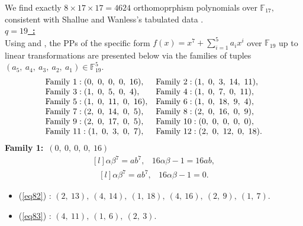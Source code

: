 \documentclass[12pt,a4wide, reqno]{amsart}
\theoremstyle{definition}
\theoremstyle{remark}
\numberwithin{equation}{section}
\begin{document}
We find exactly $8\times 17 \times 17=4624$ orthomoprphism polynomials over $\mathbb{F}_{17},$ consistent with Shallue and Wanless's tabulated data \cite[Table~3.2]{shallue}.
 \vspace{0.5 cm}\\
\underline{\Large \textbf{$q=19$~:}}
\vspace{0.2cm}\\
Using  and , the PPs of the specific form $f(x)=x^7+\sum_{i=1}^{5}a_ix^i$ over $\mathbb{F}_{19}$ up to linear transformations are presented below via the families of tuples $(a_5,~a_4,~a_3,~a_2,~a_1)\in\mathbb{F}_{19}^5.$
\begin{equation*}
\begin{matrix*}[l]
     \textup{Family 1}:(0,~0,~0,~0,~16), & \textup{Family 2}:(1,~0,~3,~14,~11),\\
     \textup{Family 3}: (1,~0,~5,~0,~4),&\textup{Family 4}:(1,~0,~7,~0,~11), \\
     \textup{Family 5}:(1,~0,~11,~0,~16),& \textup{Family 6}: (1,~0,~18,~9,~4),\\
     \textup{Family 7}:(2,~0,~14,~0,~5),& \textup{Family 8}:(2,~0,~16,~0,~9),\\
 \textup{Family 9}:(2,~0,~17,~0,~5),&\textup{Family 10}:(0,~0,~0,~0,~0),\\
 \textup{Family 11}:(1,~0,~3,~0,~7), & \textup{Family 12}:(2,~0,~12,~0,~18).\\ 
 
\end{matrix*}
\end{equation*}
\textbf{Family 1:}~$(0,~0,~0,~0,~16)$ 
\begin{equation}\label{eq82}
    \begin{matrix*}[l]
         \alpha \beta ^7=ab^7, & 16\alpha\beta-1=16ab,
    \end{matrix*}
\end{equation}
\begin{equation}\label{eq83}
    \begin{matrix*}[l]
         \alpha \beta ^7=ab^7, & 16\alpha\beta-1=0.
    \end{matrix*}
\end{equation}
\begin{itemize}
    \item 
    (\ref{eq82}) : $(2,~13),~(4,~14),~(1,~18),~(4,~16),~(2,~9),~(1,~7).$
    \item 
    (\ref{eq83}) : $(4,~11),~(1,~6),~(2,~3).$
    \end{itemize}
\end{document}
